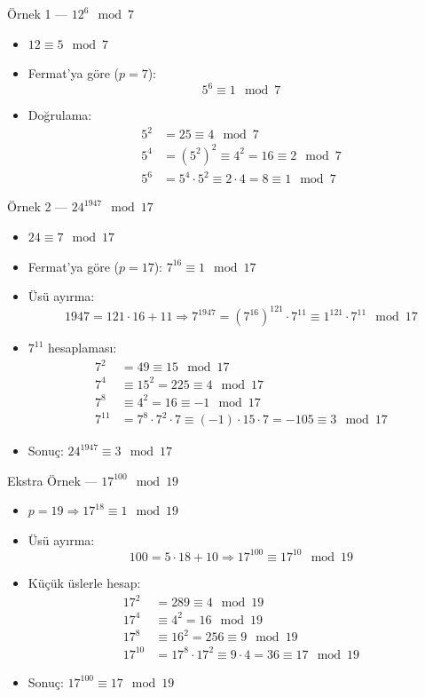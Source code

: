 \documentclass{beamer}
\begin{document}
\begin{frame}{Örnek 1 — $12^6 \mod 7$}
  \begin{itemize}
    \item $12 \equiv 5 \mod 7$
    \item Fermat'ya göre ($p=7$):
    \[
      5^6 \equiv 1 \mod 7
    \]
    \item Doğrulama:
    \begin{align*}
      5^2 &= 25 \equiv 4 \mod 7 \\
      5^4 &= (5^2)^2 \equiv 4^2 = 16 \equiv 2 \mod 7 \\
      5^6 &= 5^4 \cdot 5^2 \equiv 2 \cdot 4 = 8 \equiv 1 \mod 7
    \end{align*}
  \end{itemize}
\end{frame}

\begin{frame}{Örnek 2 — $24^{1947} \mod 17$}
  \begin{itemize}
    \item $24 \equiv 7 \mod 17$
    \item Fermat'ya göre ($p=17$): $7^{16} \equiv 1 \mod 17$
    \item Üsü ayırma:
    \[
      1947 = 121 \cdot 16 + 11 \Rightarrow 7^{1947} = (7^{16})^{121} \cdot 7^{11} \equiv 1^{121} \cdot 7^{11} \mod 17
    \]
    \item $7^{11}$ hesaplaması:
    \begin{align*}
      7^2 &= 49 \equiv 15 \mod 17 \\
      7^4 &\equiv 15^2 = 225 \equiv 4 \mod 17 \\
      7^8 &\equiv 4^2 = 16 \equiv -1 \mod 17 \\
      7^{11} &= 7^8 \cdot 7^2 \cdot 7 \equiv (-1) \cdot 15 \cdot 7 = -105 \equiv 3 \mod 17
    \end{align*}
    \item Sonuç: $24^{1947} \equiv 3 \mod 17$
  \end{itemize}
\end{frame}

\begin{frame}{Ekstra Örnek — $17^{100} \mod 19$}
  \begin{itemize}
    \item $p = 19 \Rightarrow 17^{18} \equiv 1 \mod 19$
    \item Üsü ayırma:
    \[
      100 = 5 \cdot 18 + 10 \Rightarrow 17^{100} \equiv 17^{10} \mod 19
    \]
    \item Küçük üslerle hesap:
    \begin{align*}
      17^2 &= 289 \equiv 4 \mod 19 \\
      17^4 &\equiv 4^2 = 16 \mod 19 \\
      17^8 &\equiv 16^2 = 256 \equiv 9 \mod 19 \\
      17^{10} &= 17^8 \cdot 17^2 \equiv 9 \cdot 4 = 36 \equiv 17 \mod 19
    \end{align*}
    \item Sonuç: $17^{100} \equiv 17 \mod 19$
  \end{itemize}
\end{frame}
\end{document}
